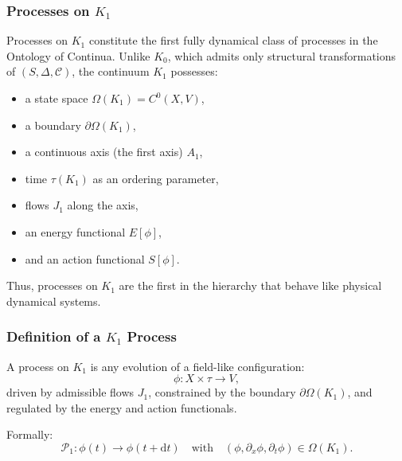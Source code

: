 

\subsubsection{Processes on \texorpdfstring{$K_1$}{K_1}}
\label{sec:processes-k1}

Processes on $K_1$ constitute the first fully dynamical class of processes
in the Ontology of Continua. Unlike $K_0$, which admits only structural
transformations of $(S,\Delta,\mathcal{C})$, the continuum $K_1$ possesses:

\begin{itemize}
    \item a state space $\Omega(K_1) = C^0(X,V)$,
    \item a boundary $\partial\Omega(K_1)$,
    \item a continuous axis (the first axis) $A_1$,
    \item time $\tau(K_1)$ as an ordering parameter,
    \item flows $J_1$ along the axis,
    \item an energy functional $E[\phi]$,
    \item and an action functional $S[\phi]$.
\end{itemize}

Thus, processes on $K_1$ are the first in the hierarchy that behave like
physical dynamical systems.

\subsubsection{Definition of a \texorpdfstring{$K_1$}{K_1} Process}

A process on $K_1$ is any evolution of a field-like configuration:
\[
\phi: X \times \tau \to V,
\]
driven by admissible flows $J_1$, constrained by the boundary
$\partial\Omega(K_1)$, and regulated by the energy and action functionals.

Formally:
\[
\mathcal{P}_1: \phi(t) \longrightarrow \phi(t+\mathrm{d}t)
\quad \text{with} \quad
(\phi, \partial_x \phi, \partial_t \phi) \in \Omega(K_1).
\]

